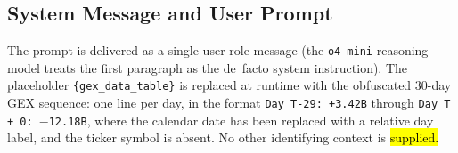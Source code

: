 \documentclass[jrfm,article,accept,moreauthors,pdftex]{Definitions/mdpi}
\begin{document}
\subsection{System Message and User Prompt}
\label{app:prompt:body}

The prompt is delivered as a single user-role message (the
\texttt{o4-mini} reasoning model treats the first paragraph as the
de~facto system instruction). The placeholder
\texttt{\{gex\_data\_table\}} is replaced at runtime with the
obfuscated 30-day GEX sequence: one line per day, in the format
\texttt{Day T-29: +3.42B} through \texttt{Day T + 0: $-$12.18B}, where the
calendar date has been replaced with a relative day label, and the
ticker symbol is absent. No other identifying context is \hl{supplied.}%
\end{document}
